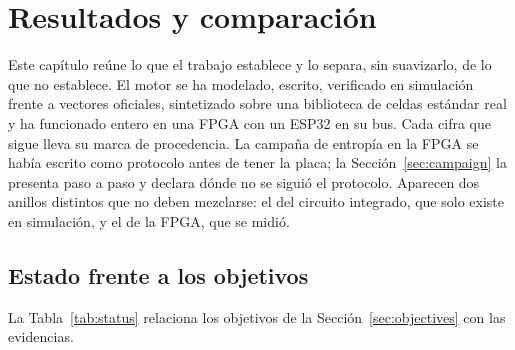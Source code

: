 \chapter{Resultados y comparación}
\label{ch:ch7_results}

Este capítulo reúne lo que el trabajo establece y lo separa, sin
suavizarlo, de lo que no establece. El motor se ha modelado, escrito,
verificado en simulación frente a vectores oficiales, sintetizado sobre
una biblioteca de celdas estándar real y ha funcionado entero en una
\ac{FPGA} con un ESP32 en su bus. Cada cifra que sigue lleva su marca de
procedencia. La campaña de entropía en la \ac{FPGA} se había escrito como
protocolo antes de tener la placa; la Sección~\ref{sec:campaign} la
presenta paso a paso y declara dónde no se siguió el protocolo. Aparecen
dos anillos distintos que no deben mezclarse: el del circuito integrado,
que solo existe en simulación, y el de la \ac{FPGA}, que se midió.

\section{Estado frente a los objetivos}
\label{sec:status}

La Tabla~\ref{tab:status} relaciona los objetivos de la
Sección~\ref{sec:objectives} con las evidencias.

